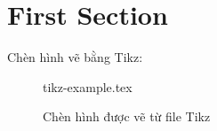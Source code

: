 \documentclass[12pt,a4paper,class=article,crop=false]{standalone}
\begin{document}
\section{First Section}
Chèn hình vẽ bằng Tikz:
\begin{figure}[htp]
  \begin{center}
    {tikz-example.tex}
  \end{center}
  \caption{Chèn hình được vẽ từ file Tikz}
\end{figure}
\end{document}
